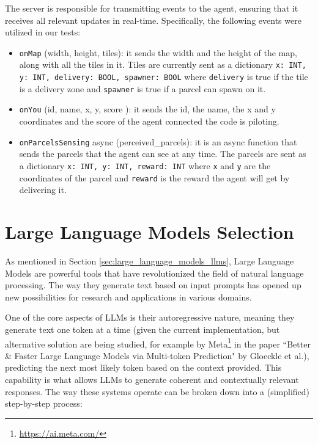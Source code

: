The server is responsible for transmitting events to the agent, ensuring that it
receives all relevant updates in real-time. Specifically, the following events were
utilized in our tests:

\begin{itemize}
  \item \texttt{onMap} (width, height, tiles): it sends the width and the height
    of the map, along with all the tiles in it. Tiles are currently sent as a dictionary
    \texttt{x: INT, y: INT, delivery: BOOL, spawner: BOOL} where \texttt{delivery}
    is true if the tile is a delivery zone and \texttt{spawner} is true if a
    parcel can spawn on it.

  \item \texttt{onYou} (id, name, x, y, score ): it sends the id, the name, the
    x and y coordinates and the score of the agent connected the code is
    piloting.

  \item \texttt{onParcelsSensing} async (perceived\_parcels): it is an async function
    that sends the parcels that the agent can see at any time. The parcels are
    sent as a dictionary \texttt{x: INT, y: INT, reward: INT} where \texttt{x}
    and \texttt{y} are the coordinates of the parcel and \texttt{reward} is the
    reward the agent will get by delivering it.
\end{itemize}

\section{Large Language Models Selection}
\label{sec:llm_models}

As mentioned in Section \ref{sec:large_language_models_llms}, Large Language
Models are powerful tools that have revolutionized the field of natural language
processing. The way they generate text based on input prompts has opened up new possibilities
for research and applications in various domains.

One of the core aspects of LLMs is their autoregressive nature, meaning they
generate text one token at a time (given the current implementation, but
alternative solution are being studied, for example by Meta\footnote{\url{https://ai.meta.com/}}
in the paper ``Better \& Faster Large Language Models via Multi-token Prediction"
by Gloeckle et al.\cite{gloeckle2024betterfasterlarge}), predicting the next most
likely token based on the context provided. This capability is what allows LLMs
to generate coherent and contextually relevant responses. The way these systems operate
can be broken down into a (simplified) step-by-step process:

